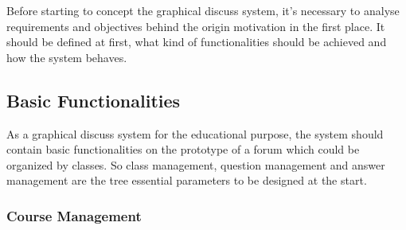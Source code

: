Before starting to concept the graphical discuss system, it's necessary to analyse requirements and objectives behind the origin motivation in the first place. It should be defined at first, what kind of functionalities should be achieved and how the system behaves.

\subsection{Basic Functionalities}

As a graphical discuss system for the educational purpose, the system should contain basic functionalities on the prototype  of a forum which could be organized by classes. So class management, question management and answer management are the tree essential parameters to be designed at the start.

\subsubsection{Course Management}

